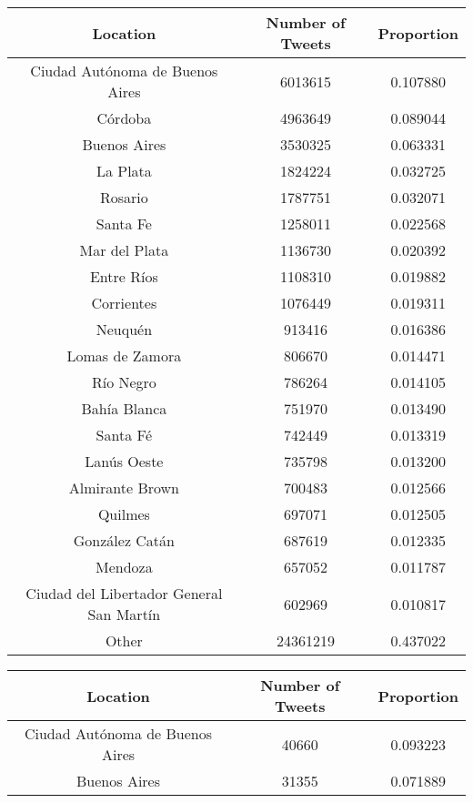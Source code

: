 \begin{table}
\centering
\begin{subtable}[c]{0.5\textwidth}
\centering
    \begin{tabular}{|c|c|c|}
    \hline
    Location & Number of Tweets & Proportion \\
    \hline
    Ciudad Autónoma de Buenos Aires & 6013615 & 0.107880 \\
    Córdoba & 4963649 & 0.089044 \\
    Buenos Aires & 3530325 & 0.063331 \\
    La Plata & 1824224 & 0.032725 \\
    Rosario & 1787751 & 0.032071 \\
    Santa Fe & 1258011 & 0.022568 \\
    Mar del Plata & 1136730 & 0.020392 \\
    Entre Ríos & 1108310 & 0.019882 \\
    Corrientes & 1076449 & 0.019311 \\
    Neuquén & 913416 & 0.016386 \\
    Lomas de Zamora & 806670 & 0.014471 \\
    Río Negro & 786264 & 0.014105 \\
    Bahía Blanca & 751970 & 0.013490 \\
    Santa Fé & 742449 & 0.013319 \\
    Lanús Oeste & 735798 & 0.013200 \\
    Almirante Brown & 700483 & 0.012566 \\
    Quilmes & 697071 & 0.012505 \\
    González Catán & 687619 & 0.012335 \\
    Mendoza & 657052 & 0.011787 \\
    Ciudad del Libertador General San Martín & 602969 & 0.010817 \\
    Other & 24361219 & 0.437022 \\
    \hline
    \end{tabular}
\end{subtable}
\begin{subtable}[c]{0.5\textwidth}
\centering
    \begin{tabular}{|c|c|c|}
    \hline
    Location & Number of Tweets & Proportion \\
    \hline
    Ciudad Autónoma de Buenos Aires & 40660 & 0.093223 \\
    Buenos Aires & 31355 & 0.071889 \\

\end{tabular}
\end{subtable}
\end{table}
